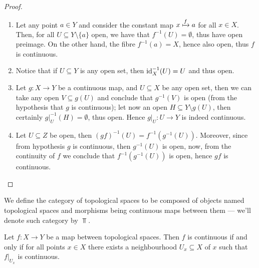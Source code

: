 \begin{proof}
    \begin{enumerate}[(1)]\setlength\itemsep{0em}
        \item Let any point \(a \in Y\) and consider the constant map \(x \xmapsto f a\)
              for all \(x \in X\). Then, for all \(U \subseteq Y \setminus \{a\}\) open, we
              have that \(f^{-1}(U) = \emptyset\), thus have open preimage. On the other
              hand, the fibre \(f^{-1}(a) = X\), hence also open, thus \(f\) is continuous.

        \item Notice that if \(U \subseteq Y\) is any open set, then \(\operatorname{id}_X^{-1}(U) =
              U\) and thus open.

        \item Let \(g : X \to Y\) be a continuous map, and \(U \subseteq X\) be any open
              set, then we can take any open \(V \subseteq g(U)\) and conclude that
              \(g^{-1}(V)\) is open (from the hypothesis that \(g\) is continuous); let now
              an open \(H \subseteq Y \setminus g(U)\), then certainly \(g|_U^{-1}(H) =
              \emptyset\), thus open. Hence \(g|_U : U \to Y\) is indeed continuous.

        \item Let \(U \subseteq Z\) be open, then \((g f)^{-1}(U) = f^{-1}
              (g^{-1}(U))\). Moreover, since from hypothesis \(g\) is continuous, then
              \(g^{-1}(U)\) is open, now, from the continuity of \(f\) we conclude that
              \(f^{-1}(g^{-1}(U))\) is open, hence \(g f\) is continuous.
    \end{enumerate}
\end{proof}

\begin{definition}
    We define the category of topological spaces to be composed of objects named
    topological spaces and morphisms being continuous maps between them --- we'll
    denote such category by \(\Top\).
\end{definition}

\begin{proposition}
    \label{prop: local criterion for continuity}
    Let \(f: X \to Y\) be a map between topological spaces. Then \(f\) is continuous
    if and only if for all points \(x \in X\) there exists a neighbourhood \(U_x
    \subseteq X\) of \(x\) such that \(f|_{U_x}\) is continuous.
\end{proposition}


